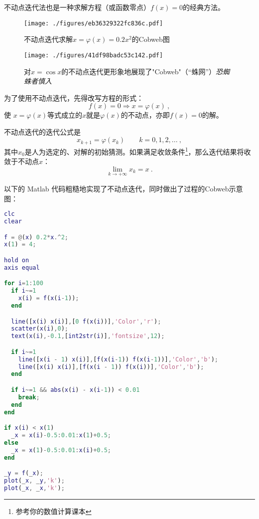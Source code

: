 

不动点迭代法也是一种求解方程（或函数零点）$f(x)=0$的经典方法。

\begin{figure}[ht]
\centering
\texttt{[image: ./figures/eb36329322fc836c.pdf]}
\caption{不动点迭代求解$x=\varphi(x)=0.2x^2$的Cobweb图} \label{fig_FPIPLT_1}
\end{figure}

\begin{figure}[ht]
\centering
\texttt{[image: ./figures/41df98badc53c142.pdf]}
\caption{对$x=\cos x$的不动点迭代更形象地展现了"Cobweb"（“蛛网”）\textsl{恐蜘蛛者慎入}} \label{fig_FPIPLT_2}
\end{figure}

为了使用不动点迭代，先得改写方程的形式：
\begin{equation}
f(x)=0\Rightarrow x = \varphi(x)~,
\end{equation}
使 $x = \varphi(x)$等式成立的$x$就是$\varphi(x)$的不动点，亦即$f(x)=0$的解。

不动点迭代的迭代公式是
\begin{equation}
x_{k+1} = \varphi(x_k) \qquad k=0,1,2,...~,
\end{equation}
其中$x_0$是人为选定的、对解的初始猜测。如果满足收敛条件\footnote{参考你的数值计算课本}，那么迭代结果将收敛于不动点$x$：
$$\lim_{k\to+\infty} x_k = x~.$$

以下的 Matlab 代码粗糙地实现了不动点迭代，同时做出了过程的Cobweb示意图：

\begin{lstlisting}[language=matlab]
clc
clear

f = @(x) 0.2*x.^2;
x(1) = 4;

hold on
axis equal

for i=1:100
  if i~=1
    x(i) = f(x(i-1));
  end

  line([x(i) x(i)],[0 f(x(i))],'Color','r');
  scatter(x(i),0);
  text(x(i),-0.1,[int2str(i)],'fontsize',12);

  if i~=1
    line([x(i - 1) x(i)],[f(x(i-1)) f(x(i-1))],'Color','b');
    line([x(i) x(i)],[f(x(i - 1)) f(x(i))],'Color','b');
  end

  if i~=1 && abs(x(i) - x(i-1)) < 0.01
    break;
  end
end

if x(i) < x(1)
  _x = x(i)-0.5:0.01:x(1)+0.5;
else
  _x = x(1)-0.5:0.01:x(i)+0.5;
end

_y = f(_x);
plot(_x, _y,'k');
plot(_x, _x,'k');
\end{lstlisting}
